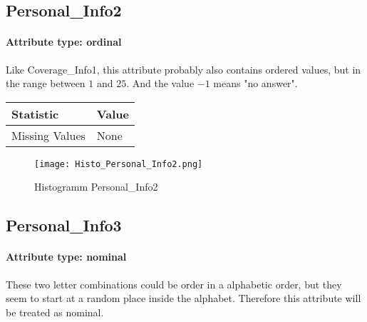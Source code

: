 \subsection{Personal\_Info2}
\paragraph{Attribute type: ordinal} Like Coverage\_Info1, this attribute probably also contains ordered values, but in the range between $1$ and $25$. And the value $-1$ means "no answer". 

\begin{table}[H]
	\renewcommand{\arraystretch}{1.25}
	\begin{tabular}{l|l}
		\textbf{Statistic} & \textbf{Value}\\\hline
		Missing Values& None\\\hline
	\end{tabular}
\end{table}
\begin{figure}[H]
	\begin{center}
		\texttt{[image: Histo\_Personal\_Info2.png]}
	\end{center}
	\caption{Histogramm Personal\_Info2}
\end{figure}

\subsection{Personal\_Info3}
\paragraph{Attribute type: nominal} These two letter combinations could be order in a alphabetic order, but they seem to start at a random place inside the alphabet. Therefore this attribute will be treated as nominal.

